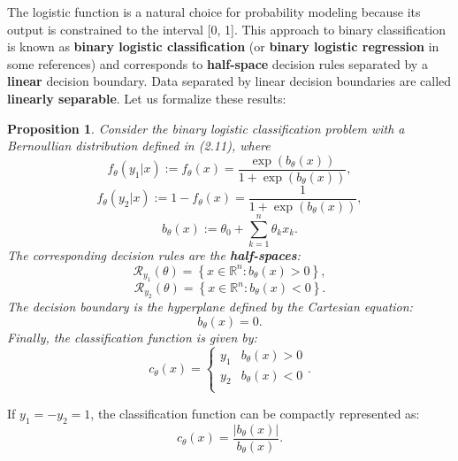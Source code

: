 \documentclass{report}
\newtheorem{proposition}{Proposition}[chapter]
\begin{document}
The logistic function is a natural choice for probability modeling because its output is constrained to the interval [0, 1]. This approach to binary classification is known as \textbf{binary logistic classification} (or \textbf{binary logistic regression} in some references) and corresponds to \textbf{half-space} decision rules separated by a \textbf{linear} decision boundary. Data separated by linear decision boundaries are called \textbf{linearly separable}. Let us formalize these results:

\begin{proposition}
Consider the binary logistic classification problem with a Bernoullian distribution defined in (2.11), where
\begin{equation}
f_\theta(y_1|x) := f_\theta(x) = \frac{\exp(b_\theta(x))}{1+\exp(b_\theta(x))},
\end{equation}
\begin{equation}
f_\theta(y_2|x) := 1- f_\theta(x) = \frac{1}{1+\exp(b_\theta(x))},
\end{equation}
\begin{equation}
b_\theta(x) := \theta_0 + \sum_{k=1}^{n}\theta_kx_k.
\end{equation}
The corresponding decision rules are the \textbf{half-spaces}:
\begin{equation}
\mathcal{R}_{y_1}(\theta) = \left\{x \in \mathbb{R}^n : b_\theta(x) > 0 \right\},
\end{equation}
\begin{equation}
\mathcal{R}_{y_2}(\theta) = \left\{ x \in \mathbb{R}^n : b_\theta(x) < 0 \right\}.
\end{equation}
The decision boundary is the hyperplane defined by the Cartesian equation:
\begin{equation}
b_\theta(x) = 0.
\end{equation}
Finally, the classification function is given by:
\begin{equation}
c_\theta(x) = \left\{\begin{matrix}
y_1 & b_\theta(x) > 0\\
y_2 & b_\theta(x) < 0\\
\end{matrix}\right..
\end{equation}
\end{proposition}
If $y_1 = -y_2 = 1$, the classification function can be compactly represented as:
\begin{equation}
c_\theta(x) = \frac{|b_\theta(x)|}{b_\theta(x)}.
\end{equation}
\end{document}
